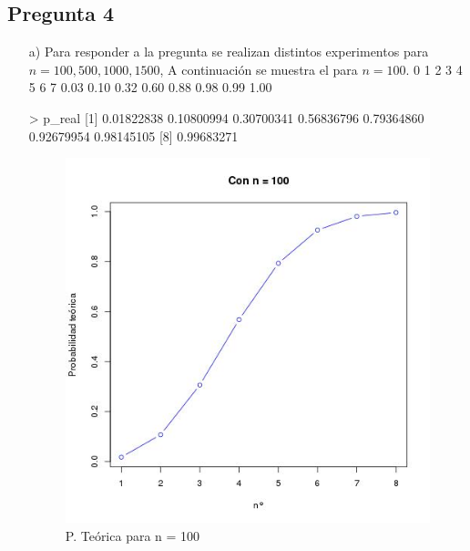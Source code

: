 \documentclass[letter,10pt]{article}
\begin{document}
\subsection{Pregunta 4}
\begin{itemize}
 \item[a)] Para responder a la pregunta se realizan distintos experimentos para $n= 100,500,1000,1500$, A continuación se muestra el para $n=100$.
    0    1    2    3    4    5    6    7 
0.03 0.10 0.32 0.60 0.88 0.98 0.99 1.00 

> p_real
[1] 0.01822838 0.10800994 0.30700341 0.56836796 0.79364860 0.92679954 0.98145105
[8] 0.99683271

 
  \begin{minipage}{\linewidth}
      \centering
      \begin{minipage}{0.45\linewidth}
          \begin{figure}[H]
              \includegraphics[width=\linewidth]{p3_teo_100.jpg}
              \caption{P. Te\'orica para n = 100}
          \end{figure}
      \end{minipage}
      \hspace{0.05\linewidth}
      \begin{minipage}{0.45\linewidth}
          \begin{figure}[H]

\end{figure}
\end{minipage}
\end{minipage}
\end{itemize}
\end{document}
